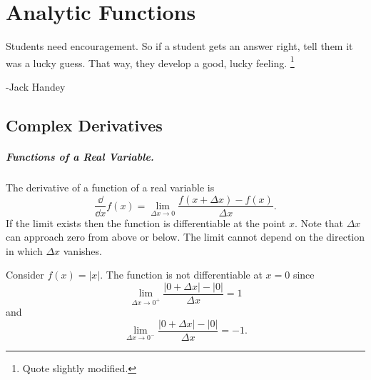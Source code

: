 
\flushbottom



\chapter{Analytic Functions}

Students need encouragement. So if a student gets an answer right, 
tell them it was a lucky guess. That way, they develop a good, lucky feeling.%
\footnote{Quote slightly modified.}

\begin{flushright}
  -Jack Handey
\end{flushright}

\section{Complex Derivatives}



\paragraph{Functions of a Real Variable.}
The derivative of a function of a real variable is
\[
\frac{\dd}{\dd x} f(x) = \lim_{\Delta x \to 0} \frac{f(x+\Delta x)-f(x)}{\Delta x}.
\]
If the limit exists then the function is differentiable at the point $x$.
Note that $\Delta x$ can approach zero from above or below.  The limit 
cannot depend on the direction in which $\Delta x$ vanishes.

Consider $f(x) = |x|$.  The function is not differentiable at $x = 0$ since
\[
\lim_{\Delta x \to 0^+} \frac{|0 + \Delta x| - |0|}{\Delta x} = 1
\]
and
\[
\lim_{\Delta x \to 0^-} \frac{|0 + \Delta x| - |0|}{\Delta x} = -1.
\]



